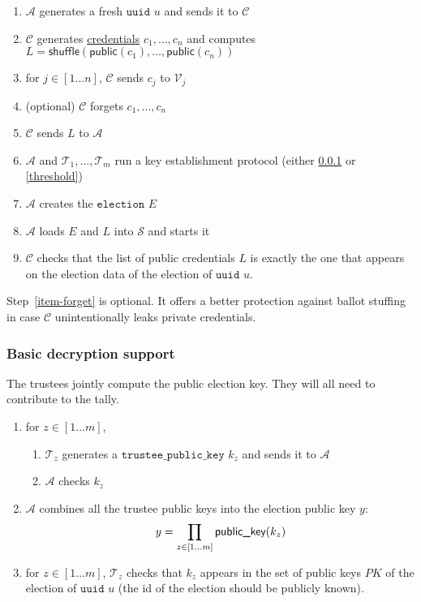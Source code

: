 \documentclass[a4paper]{article}
\newcommand{\public}{\textsf{public}}
\newcommand{\shuffle}{\textsf{shuffle}}
\newcommand{\uuid}{\texttt{uuid}}
\newcommand{\tpk}{\texttt{trustee\_public\_key}}
\newcommand{\election}{\texttt{election}}
\begin{document}
\begin{enumerate}
\item $\mathcal{A}$ generates a fresh \hyperref[basic-types]{$\uuid$} $u$ and
  sends it to $\mathcal{C}$
\item $\mathcal{C}$ generates \hyperref[credentials]{credentials}
  $c_1,\dots,c_n$ and computes
  $L=\shuffle(\public(c_1),\dots,\public(c_n))$
\item for $j\in[1\dots n]$, $\mathcal{C}$ sends $c_j$ to $\mathcal{V}_j$
\item \label{item-forget} (optional) $\mathcal{C}$ forgets $c_1,\dots,c_n$
 \item $\mathcal{C}$ sends $L$ to $\mathcal{A}$
\item $\mathcal{A}$ and $\mathcal{T}_1,\dotsc,\mathcal{T}_m$ run a key establishment protocol
  (either \ref{no-threshold} or \ref{threshold})
\item $\mathcal{A}$ creates the \hyperref[elections]{$\election$} $E$
\item $\mathcal{A}$ loads $E$ and $L$ into $\mathcal{S}$ and starts it
\item $\mathcal{C}$ checks that the list of public credentials $L$
  is exactly the one that appears on the election data of the election of
  {$\uuid$} $u$.
\end{enumerate}
Step~\ref{item-forget} is optional. It offers a better protection
against ballot stuffing in case $\mathcal{C}$ unintentionally leaks
private credentials.

\subsubsection{Basic decryption support}
\label{no-threshold}
The trustees jointly compute the public election key. They will
all need to contribute to the tally.

\begin{enumerate}
\item for $z\in[1\dots m]$,
  \begin{enumerate}
  \item $\mathcal{T}_z$ generates a \hyperref[trustee-keys]{$\tpk$} $k_z$ and
    sends it to $\mathcal{A}$
  \item $\mathcal{A}$ checks $k_z$
  \end{enumerate}
\item $\mathcal{A}$ combines all the trustee public keys into the election
  public key $y$:
  \[
  y=\prod_{z\in[1\dots m]}\textsf{public\_key}(k_z)
\]
\item for $z\in[1\dots m]$,  $\mathcal{T}_z$ checks that $k_z$ appears in the set of public keys $PK$ of the election of {$\uuid$} $u$ (the
    id of the election should be publicly known).
\end{enumerate}
\end{document}
